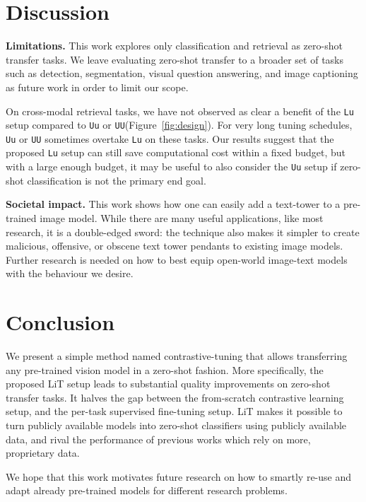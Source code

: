 \documentclass[10pt,twocolumn,letterpaper]{article}
\def \lit {LiT\xspace}
\def \Lu {{\tt Lu}\xspace}
\def \Uu {{\tt Uu}\xspace}
\def \UU {{\tt UU}\xspace}
\begin{document}
\section{Discussion}\label{sec:discussion}

\textbf{Limitations.} This work explores only classification and retrieval as zero-shot transfer tasks.
We leave evaluating zero-shot transfer to a broader set of tasks such as detection, segmentation, visual question answering, and image captioning as future work in order to limit our scope.

On cross-modal retrieval tasks, we have not observed as clear a benefit of the \Lu setup compared to \Uu or \UU (Figure~\ref{fig:design}). 
For very long tuning schedules, \Uu or \UU sometimes overtake \Lu on these tasks.
Our results suggest that the proposed \Lu setup can still save computational cost within a fixed budget, but with a large enough budget, it may be useful to also consider the \Uu setup if zero-shot classification is not the primary end goal.

\textbf{Societal impact.} This work shows how one can easily add a text-tower to a pre-trained image model. While there are many useful applications, like most research, it is a double-edged sword: the technique also makes it simpler to create malicious, offensive, or obscene text tower pendants to existing image models.
Further research is needed on how to best equip open-world image-text models with the behaviour we desire. 



\section{Conclusion}\label{sec:conclusion}

We present a simple method named contrastive-tuning that allows transferring any pre-trained vision model in a zero-shot fashion.
More specifically, the proposed \lit{} setup leads to substantial quality improvements on zero-shot transfer tasks.
It halves the gap between the from-scratch contrastive learning setup, and the per-task supervised fine-tuning setup.
\lit makes it possible to turn publicly available models into zero-shot classifiers using publicly available data, and rival the performance of previous works which rely on more, proprietary data.

We hope that this work motivates future research on how to smartly re-use and adapt already pre-trained models for different research problems.
\end{document}
